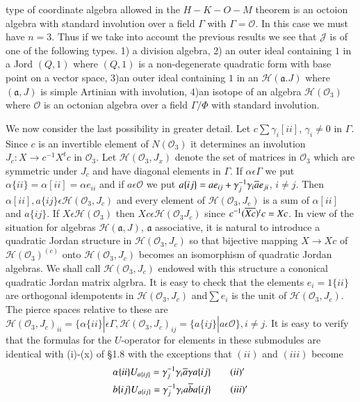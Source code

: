 type of coordinate algebra allowed in the $H-K-O-M$\pageoriginale
theorem is an octoion algebra with standard involution over a field
$\Gamma$ with $\Gamma =\mathcal{O}$. In this case we must have
$n=3$. Thus if we take into account the previous results we see that
$\mathscr{J}$ is of one of the following types. 1) a division algebra,
2) an outer ideal containing $1$ in a Jord $(Q,1)$ where $(Q,1)$ is a
non-degenerate quadratic form with base point on a vector space, 3)an
outer ideal containing $1$ in an $\mathscr{H}(\mathfrak{a}.J)$ where
$(\mathfrak{a},J)$ is simple Artinian with involution, 4)an isotope of
an algebra $\mathscr{H}(\mathcal{O}_3)$ where $\mathcal{O}$ is an
octonian algebra over a field $\Gamma/\Phi$ with standard involution.

We now consider the last possibility in greater detail. Let
$c\sum\gamma_i[ii]$, $\gamma_i\neq 0$ in $\Gamma$. Since $c$ is an
invertible element of $N(\mathcal{O}_3)$ it determines an involution
$J_c:X\to c^{-1}X^{t}c$ in $\mathcal{O}_3$. Let
$\mathscr{H}(\mathcal{O}_3,J_x)$ denote the set of matrices in
$\mathcal{O}_3$ which are symmetric under $J_c$ and have diagonal
elements in $\Gamma$. If $\alpha\epsilon \Gamma$ we put
$\alpha\{ii\}=\alpha[ii]=\alpha e_{ii}$ and if $a\epsilon \mathcal{O}$
we put $a\{ij\}=ae_{ij}+\gamma_{j}^{-1}\gamma_i\overline{a}e_{ji}$, $i\neq
j$. Then $\alpha[ii], a\{ij\}\epsilon \mathscr{H}(\mathcal{O}_3,J_c)$
and every element of $\mathscr{H}(\mathcal{O}_3, J_c)$ is a sum of
$\alpha[ii]$ and $a\{ij\}$. If $X\epsilon \mathscr{H}(\mathcal{O}_3)$
then $X c\epsilon \mathscr{H}(\mathcal{O}_3J_c)$ since
$c^{-1}(\overline{Xc})^{t}c=Xc$. In view of the situation for algebras
$\mathscr{H}(\mathfrak{a},J)$, $\mathfrak{a}$ associative, it is
natural to introduce a quadratic Jordan structure in
$\mathscr{H}(\mathcal{O}_3, J_c)$ so that bijective mapping $X\to Xc$
of $\mathscr{H}(\mathcal{O}_3)^{(c)}$ onto
$\mathscr{H}(\mathcal{O}_3,J_c)$ becomes an isomorphism of quadratic
Jordan algebras. We shall call $\mathscr{H}(\mathcal{O}_3,J_c)$
endowed with this structure a cononical quadratic Jordan matrix
algrbra. It is easy to check that the elements $e_i=1\{ii\}$ are
orthogonal idempotents in $\mathscr{H}(\mathcal{O}_3,J_c)$
and\pageoriginale $\sum e_i$ is the unit of
$\mathscr{H}(\mathcal{O}_3,J_c)$. The pierce spaces relative to these
are $\mathscr{H}(\mathcal{O}_3,J_c)_{ii}=\{\alpha\{ii\}|\epsilon
\Gamma, \mathscr{H}(\mathcal{O}_3,J_c)_{ij}=\{a\{ij\}|a\epsilon
\mathcal{O}\}, i\neq j$. It is easy to verify that the formulas for
the $U$-operator for elements in these submodules are identical with
(i)-(x) of \S 1.8 with the exceptions that $(ii)$ and $(iii)$ become
\begin{align*}
  &\alpha\{ii\}U_{a\{ij\}}=\gamma^{-1}_j\gamma_i\overline{a}\gamma
  a\{ij\}\tag*{$(ii)'$}\\
  &b\{ij\}U_{a\{ij\}}=\gamma^{-1}_j\gamma_ia\overline{b}a\{ij\}\tag*{$(iii)'$} 
\end{align*}


